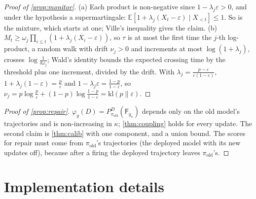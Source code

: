 \documentclass{article}
\theoremstyle{plain}
\theoremstyle{definition}
\theoremstyle{remark}
\newcommand{\E}{\mathbb{E}}
\newcommand{\kl}{\mathrm{kl}}
\newcommand{\pold}{\pi_{\mathrm{old}}}
\newcommand{\Fire}{\mathsf{F}}
\begin{document}
\begin{proof}[Proof of \cref{prop:monitor}]
(a) Each product is non-negative since $1-\lambda_j\varepsilon>0$, and under the hypothesis a supermartingale:
$\E[1+\lambda_j(X_t-\varepsilon)\mid X_{<t}]\le1$. So is the mixture, which starts at one; Ville's inequality
\citep{ville1939} gives the claim. (b) $M_t\ge \omega_j\prod_{i\le t}(1+\lambda_j(X_i-\varepsilon))$, so $\tau$ is at most
the first time the $j$-th log-product, a random walk with drift $\nu_j>0$ and increments at most
$\log(1+\lambda_j)$, crosses $\log\frac1{\delta\omega_j}$; Wald's identity bounds the expected crossing time by the threshold plus one
increment, divided by the drift. With $\lambda_j=\frac{p-\varepsilon}{\varepsilon(1-\varepsilon)}$,
$1+\lambda_j(1-\varepsilon)=\frac p\varepsilon$ and $1-\lambda_j\varepsilon=\frac{1-p}{1-\varepsilon}$, so
$\nu_j=p\log\frac p\varepsilon+(1-p)\log\frac{1-p}{1-\varepsilon}=\kl(p\|\varepsilon)$.
\end{proof}

\begin{proof}[Proof of \cref{prop:repair}]
$\varphi_g(D)=P^D_{\pold}(\Fire_{g_\kappa})$ depends only on the old model's trajectories and is non-increasing in $\kappa$;
\cref{thm:coupling} holds for every update. The second claim is \cref{thm:calib} with one component, and a union
bound. The scores for repair must come from $\pold$'s trajectories (the deployed model with its new updates off),
because after a firing the deployed trajectory leaves $\pold$'s.
\end{proof}

\section{Implementation details}
\label{app:impl}
\end{document}
